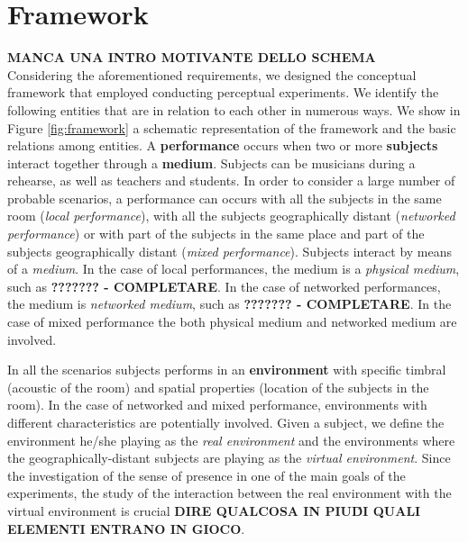 \section{Framework}\label{sec:framework}
\textbf{MANCA UNA INTRO MOTIVANTE DELLO SCHEMA}\\
Considering the aforementioned requirements, we designed the conceptual framework that employed conducting perceptual experiments. We identify the following entities that are in relation to each other in numerous ways. We show in Figure \ref{fig:framework} a schematic representation of the framework and the basic relations among entities. A \textbf{performance} occurs when two or more \textbf{subjects} interact together through a \textbf{medium}. Subjects can be musicians during a rehearse, as well as teachers and students. In order to consider a large number of probable scenarios, a performance can occurs with all the subjects in the same room (\textit{local performance}), with all the subjects geographically distant (\textit{networked performance}) or with part of the subjects in the same place and part of the subjects geographically distant (\textit{mixed performance}). Subjects interact by means of a \textit{medium}. In the case of local performances, the medium is a \textit{physical medium}, such as \textbf{??????? - COMPLETARE}. In the case of networked performances, the medium is \textit{networked medium}, such as \textbf{??????? - COMPLETARE}. In the case of mixed performance the both physical medium and networked medium are involved. 

In all the scenarios subjects performs in an \textbf{environment} with specific timbral (acoustic of the room) and spatial properties (location of the subjects in the room). In the case of networked and mixed performance, environments with different characteristics are potentially involved. Given a subject, we define the environment he/she playing as the \textit{real environment} and the environments where the geographically-distant subjects are playing as the \textit{virtual environment}. Since the investigation of the sense of presence in one of the main goals of the experiments, the study of the interaction between the real environment with the virtual environment is crucial \textbf{DIRE QUALCOSA IN PIU\' DI QUALI ELEMENTI ENTRANO IN GIOCO}.



